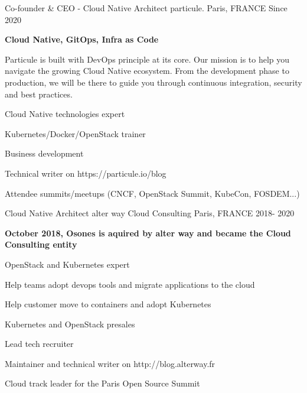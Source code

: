 

\begin{cventries}
\cventry
    {Co-founder \& CEO - Cloud Native Architect} %
    {particule.} %
    {Paris, FRANCE} %
    {Since 2020} %
    {
      \begin{cvitems} %
      \item {\textbf{Cloud Native, GitOps, Infra as Code}}
      \item {Particule is built with DevOps principle at its core. Our mission
        is to help you navigate the growing Cloud Native ecosystem. From the
          development phase to production, we will be there to guide you
          through continuous integration, security and best practices.}
        \item {Cloud Native technologies expert}
        \item {Kubernetes/Docker/OpenStack trainer}
        \item {Business development}
        \item {Technical writer on https://particule.io/blog}
        \item {Attendee summits/meetups (CNCF, OpenStack Summit, KubeCon, FOSDEM...)}
      \end{cvitems}
    }

  \cventry
    {Cloud Native Architect} %
    {alter way Cloud Consulting} %
    {Paris, FRANCE} %
    {2018- 2020} %
    {
      \begin{cvitems} %
      \item {\textbf{October 2018, Osones is aquired by alter way and became the Cloud
        Consulting entity}}
      \item {OpenStack and Kubernetes expert}
      \item {Help teams adopt devops tools and migrate applications to the
        cloud}
      \item {Help customer move to containers and adopt Kubernetes}
      \item {Kubernetes and OpenStack presales}
      \item {Lead tech recruiter}
      \item {Maintainer and technical writer on http://blog.alterway.fr}
      \item {Cloud track leader for the Paris Open Source Summit}
      \end{cvitems}
    }


\end{cventries}
